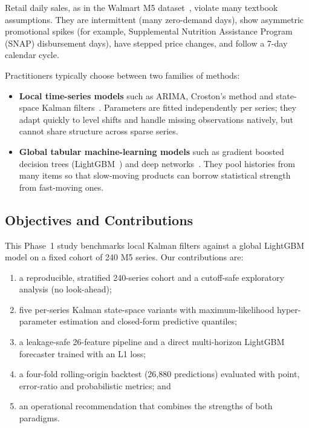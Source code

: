 \documentclass[11pt,a4paper]{article}
\begin{document}
Retail daily sales, as in the Walmart M5 dataset~\cite{makridakis2022}, violate many textbook assumptions. They are intermittent (many zero-demand days), show asymmetric promotional spikes (for example, Supplemental Nutrition Assistance Program (SNAP) disbursement days), have stepped price changes, and follow a 7-day calendar cycle.

Practitioners typically choose between two families of methods:
\begin{itemize}[leftmargin=2em,itemsep=2pt]
  \item \textbf{Local time-series models} such as ARIMA, Croston's method and state-space Kalman filters~\cite{kalman1960,harvey1990}. Parameters are fitted independently per series; they adapt quickly to level shifts and handle missing observations natively, but cannot share structure across sparse series.
  \item \textbf{Global tabular machine-learning models} such as gradient boosted decision trees (LightGBM~\cite{ke2017}) and deep networks~\cite{salinas2020}. They pool histories from many items so that slow-moving products can borrow statistical strength from fast-moving ones.
\end{itemize}

\subsection{Objectives and Contributions}
This Phase~1 study benchmarks local Kalman filters against a global LightGBM model on a fixed cohort of 240 M5 series. Our contributions are:
\begin{enumerate}[leftmargin=2em,itemsep=2pt]
  \item a reproducible, stratified 240-series cohort and a cutoff-safe exploratory analysis (no look-ahead);
  \item five per-series Kalman state-space variants with maximum-likelihood hyper-parameter estimation and closed-form predictive quantiles;
  \item a leakage-safe 26-feature pipeline and a direct multi-horizon LightGBM forecaster trained with an L1 loss;
  \item a four-fold rolling-origin backtest (26,880 predictions) evaluated with point, error-ratio and probabilistic metrics; and
  \item an operational recommendation that combines the strengths of both paradigms.
\end{enumerate}

\end{document}
